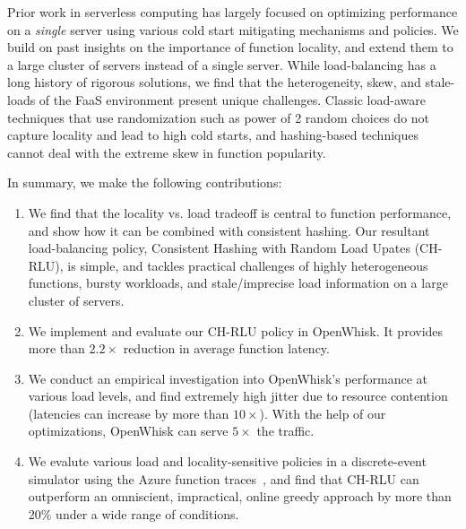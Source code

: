 Prior work in serverless computing has largely focused on optimizing performance on a \emph{single} server using various cold start mitigating mechanisms and policies. 
We build on past insights on the importance of function locality, and extend them to a large cluster of servers instead of a single server. 
While load-balancing has a long history of rigorous solutions, we find that the heterogeneity, skew, and stale-loads of the FaaS environment present unique challenges. 
Classic load-aware techniques that use randomization such as power of 2 random choices do not capture locality and lead to high cold starts, and hashing-based techniques cannot deal with the extreme skew in function popularity.



In summary, we make the following contributions:

\begin{enumerate}
\item We find that the locality vs. load tradeoff is central to function performance, and show how it can be combined with consistent hashing. Our resultant load-balancing policy, Consistent Hashing with Random Load Upates (CH-RLU), is simple, and tackles practical challenges of highly heterogeneous functions, bursty workloads, and stale/imprecise load information on a large cluster of servers.
\item We implement and evaluate our CH-RLU policy in OpenWhisk. It provides more than $2.2\times$ reduction in average function latency.
\item We conduct an empirical investigation into OpenWhisk's performance at various load levels, and find extremely high jitter due to resource contention (latencies can increase by more than $10\times$).
  With the help of our optimizations, OpenWhisk can serve $5\times$ the traffic. 
\item We evalute various load and locality-sensitive policies in a discrete-event simulator using the Azure function traces~\cite{shahrad_serverless_2020}, and find that CH-RLU can outperform an omniscient, impractical, online greedy approach by more than 20\% under a wide range of conditions. 
\end{enumerate}

